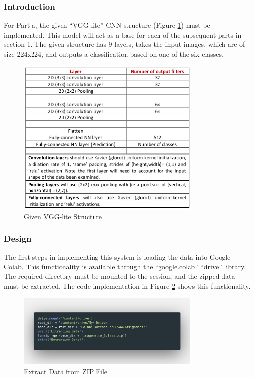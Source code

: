 \subsubsection{Introduction}

For Part a, the given ``VGG-lite'' CNN structure (Figure
\ref{fig:images-vgglite}) must be implemented. This model will act as a base for
each of the subsequent parts in section 1. The given structure has 9 layers,
takes the input images, which are of size 224x224, and outputs a classification
based on one of the six classes.

\begin{figure}[H]
	\centering
	\includegraphics[width=0.8\textwidth]{images/vgglite}
	\caption{Given VGG-lite Structure}
	\label{fig:images-vgglite}
\end{figure}

\subsubsection{Design}

The first steps in implementing
this system is loading the data into Google Colab. This functionality is
available through the ``google.colab'' ``drive'' library. The required directory
must be mounted to the session, and the zipped data must be extracted. The code
implementation in Figure \ref{fig:unzip} shows this functionality.

\begin{figure}[H]
	\centering
	\includegraphics[width=0.8\textwidth]{images/Code/loadData}
	\caption{Extract Data from ZIP File}
	\label{fig:unzip}
\end{figure}

